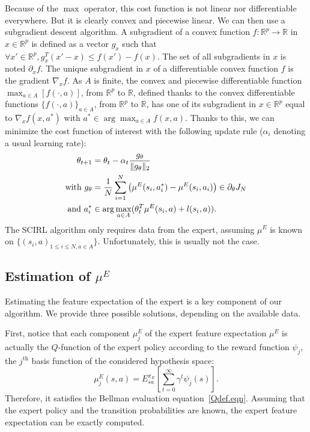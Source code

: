 \documentclass{article}
\begin{document}
Because of the $\max$ operator, this cost function is not linear nor
differentiable everywhere. But it is clearly convex and piecewise
linear.
%
We can then use a subgradient descent algorithm. A subgradient of a
convex function $f:\mathbb{R}^p\rightarrow \mathbb{R}$ in
$x\in\mathbb{R}^p$ is defined as a vector $g_x$ such that $\forall
x' \in \mathbb{R}^p, g_x^T(x'-x)\leq f(x')-f(x)$. The set of all
subgradients in $x$ is noted $\partial_xf$. The unique subgradient
in $x$ of a differentiable convex function $f$ is the gradient
$\nabla_xf$. As $A$ is finite, the convex and piecewise
differentiable function $\max_{a\in A}[f(\cdot,a)]$, from
$\mathbb{R}^p$ to $\mathbb{R}$, defined thanks to the convex
differentiable functions $\{f(\cdot,a)\}_{a\in A}$, from
$\mathbb{R}^p$ to $\mathbb{R}$, has one of its subgradient in
$x\in\mathbb{R}^p$ equal to $\nabla_xf(x,a^*)$ with
$a^*\in\arg\max_{a\in A}f(x,a)$. Thanks to this, we can minimize the
cost function of interest with the following update rule ($\alpha_i$
denoting a usual learning rate):%
\begin{align}
  \theta_{t+1}&=\theta_t -\alpha_t\frac{g_{\theta}}{\|g_{\theta}\|_2}
  \\
  \text{with }
  g_{\theta} &= {1\over N}\sum\limits_{i=1}^N\left(\mu^E(s_i,a^*_i) - \mu^E(s_i,a_i)\right)\in \partial_\theta J_N
  \\
  \text{and } a^*_i &\in \arg\max_{a\in A}(\theta_t^T \mu^E(s_i,a) +
  l(s_i,a)).
\end{align}
The SCIRL algorithm only requires data from the expert, assuming
$\mu^E$ is known on $\{(s_i,a)_{1\leq i \leq N,a\in A}\}$.
Unfortunately, this is usually not the case.


\subsection{Estimation of $\mu^E$}
\label{calculmu.sec}

Estimating the feature expectation of the expert is a key component
of our algorithm. We provide three possible solutions, depending on
the available data.

First, notice that each component $\mu_j^E$ of the expert feature
expectation $\mu^E$ is actually the $Q$-function of the expert
policy according to the reward function $\psi_j$, the $j^\text{th}$
basis function of the considered hypothesis space:
\begin{equation}
\mu^E_j(s,a) = E^{\pi_E}_{sa}[\sum\limits_{t=0}^\infty \gamma^t
\psi_j(s)].\label{eq:muE_bellman}
\end{equation}
Therefore, it satisfies the Bellman evaluation
equation~\eqref{Qdef.eqn}. Assuming that the expert policy and the
transition probabilities are known, the expert feature expectation
can be exactly computed.
\end{document}
